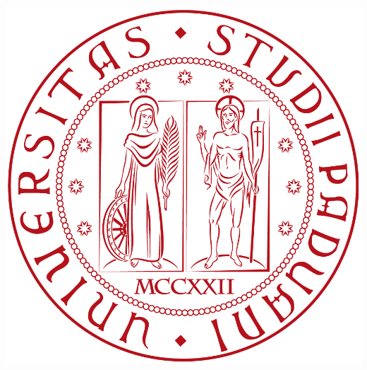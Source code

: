 \documentclass[a4paper]{report}
\begin{document}
%


\renewcommand{\chaptermark}[1]{\markboth{\small\textsc{\thechapter.\ #1}}{}}
\renewcommand{\sectionmark}[1]{\markright{\small\textsc{\thesection.\ #1}}{}}



\begin{titlepage}
\begin{center}
\includegraphics[scale=0.1]{images/logo.png}\\


\end{center}
\end{titlepage}
\end{document}

